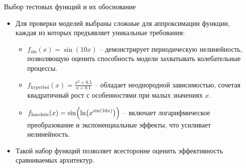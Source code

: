 \documentclass
  [ russian
  , aspectratio=1610 %
  ] {beamer}
\begin{document}
\begin{frame}{Выбор тестовых функций и их обоснование}
    \begin{itemize}
        \item Для проверки моделей выбраны сложные для аппроксимации функции, каждая из которых предъявляет уникальные требования:
              \begin{itemize}
                  \item \(\displaystyle f_{\sin}(x)=\sin(10x)\) – демонстрирует периодическую нелинейность, позволяющую оценить способность модели захватывать колебательные процессы.
                  \item \(\displaystyle f_{\text{hyperbol}}(x)=\frac{x^2+0.5}{x+0.1}\) – обладает неоднородной зависимостью, сочетая квадратичный рост с особенностями при малых значениях \(x\).
                  \item \(\displaystyle f_{\text{hardsin}}(x)=\sin\Bigl(\ln\bigl(x^{\sin(10x)}\bigr)\Bigr)\) – включает логарифмическое преобразование и экспоненциальные эффекты, что усиливает нелинейность.
              \end{itemize}
        \item Такой набор функций позволяет всесторонне оценить эффективность сравниваемых архитектур.
    \end{itemize}
\end{frame}
\end{document}
